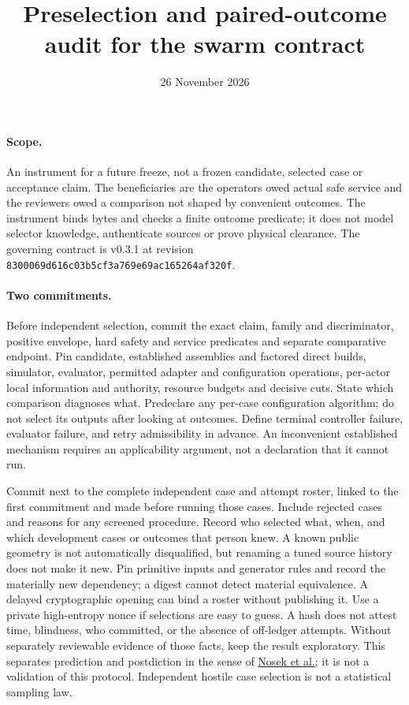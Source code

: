 \documentclass{article}
\title{Preselection and paired-outcome audit for the swarm contract}
\date{26 November 2026}
\begin{document}
\maketitle
\paragraph{Scope.}
An instrument for a future freeze, not a frozen candidate, selected case or
acceptance claim. The beneficiaries are the operators owed actual safe
service and the reviewers owed a comparison not shaped by convenient
outcomes. The instrument binds bytes and checks a finite outcome predicate;
it does not model selector knowledge, authenticate sources or prove
physical clearance. The governing contract is v0.3.1 at revision
\texttt{8300069d616c03b5cf3a769e69ac165264af320f}.

\paragraph{Two commitments.}
Before independent selection, commit the exact claim, family and
discriminator, positive envelope, hard safety and service predicates and
separate comparative endpoint. Pin candidate, established assemblies and
factored direct builds, simulator, evaluator, permitted adapter and
configuration operations, per-actor local information and authority,
resource budgets and decisive cuts. State which comparison diagnoses what.
Predeclare any per-case configuration algorithm; do not select its outputs
after looking at outcomes. Define terminal controller failure, evaluator
failure, and retry admissibility in advance. An inconvenient established
mechanism requires an applicability argument, not a declaration that it
cannot run.

Commit next to the complete independent case and attempt roster, linked to
the first commitment and made before running those cases. Include rejected
cases and reasons for any screened procedure. Record who selected what,
when, and which development cases or outcomes that person knew. A known
public geometry is not automatically disqualified, but renaming a tuned
source history does not make it new. Pin primitive inputs and generator
rules and record the materially new dependency; a digest cannot detect
material equivalence. A delayed cryptographic opening can bind a roster
without publishing it. Use a private high-entropy nonce if selections are
easy to guess. A hash does not attest time, blindness, who committed, or
the absence of off-ledger attempts. Without separately reviewable evidence
of those facts, keep the result exploratory. This separates prediction
and postdiction in the sense of
\href{https://doi.org/10.1073/pnas.1708274114}{Nosek et al.};
it is not a validation of this protocol.
Independent hostile case selection is not a statistical sampling law.
\end{document}
